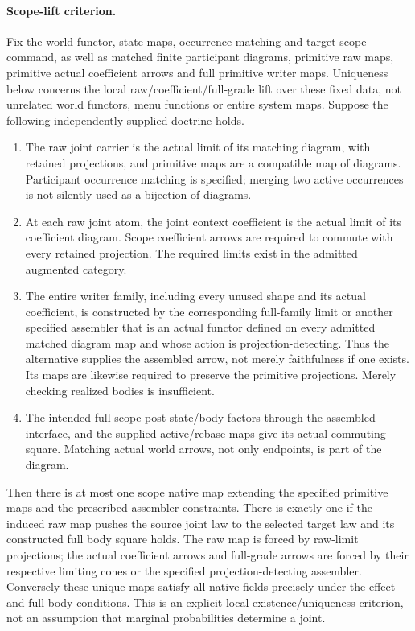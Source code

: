 \documentclass[11pt]{article}
\begin{document}
\paragraph{Scope-lift criterion.}
Fix the world functor, state maps, occurrence matching and target scope command, as well as matched finite participant diagrams, primitive raw maps, primitive actual coefficient arrows and full primitive writer maps. Uniqueness below concerns the local raw/coefficient/full-grade lift over these fixed data, not unrelated world functors, menu functions or entire system maps. Suppose the following independently supplied doctrine holds.
\begin{enumerate}
\item The raw joint carrier is the actual limit of its matching diagram, with retained projections, and primitive maps are a compatible map of diagrams. Participant occurrence matching is specified; merging two active occurrences is not silently used as a bijection of diagrams.
\item At each raw joint atom, the joint context coefficient is the actual limit of its coefficient diagram. Scope coefficient arrows are required to commute with every retained projection. The required limits exist in the admitted augmented category.
\item The entire writer family, including every unused shape and its actual coefficient, is constructed by the corresponding full-family limit or another specified assembler that is an actual functor defined on every admitted matched diagram map and whose action is projection-detecting. Thus the alternative supplies the assembled arrow, not merely faithfulness if one exists. Its maps are likewise required to preserve the primitive projections. Merely checking realized bodies is insufficient.
\item The intended full scope post-state/body factors through the assembled interface, and the supplied active/rebase maps give its actual commuting square. Matching actual world arrows, not only endpoints, is part of the diagram.
\end{enumerate}
Then there is at most one scope native map extending the specified primitive maps and the prescribed assembler constraints. There is exactly one if the induced raw map pushes the source joint law to the selected target law and its constructed full body square holds. The raw map is forced by raw-limit projections; the actual coefficient arrows and full-grade arrows are forced by their respective limiting cones or the specified projection-detecting assembler. Conversely these unique maps satisfy all native fields precisely under the effect and full-body conditions. This is an explicit local existence/uniqueness criterion, not an assumption that marginal probabilities determine a joint.
\end{document}
